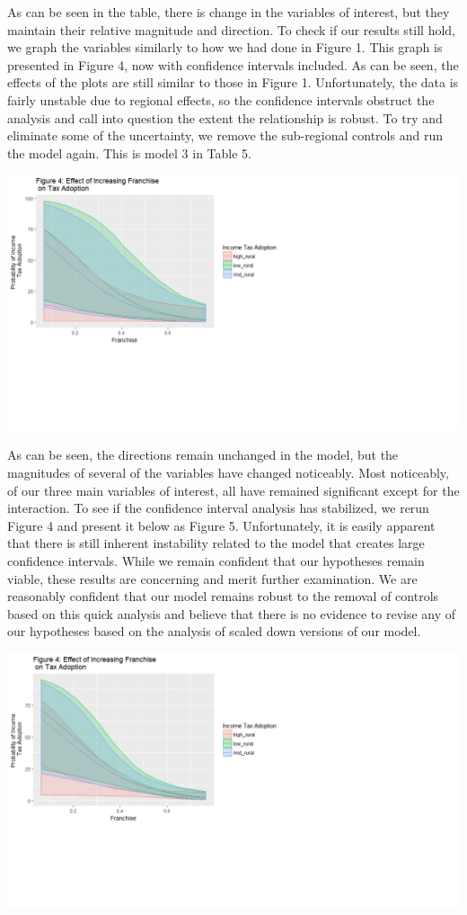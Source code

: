 \documentclass[letter, 12pt]{article}
\begin{document}
As can be seen in the table, there is change in the variables of interest, but they maintain their relative magnitude and direction. To check if our results still hold, we graph the variables similarly to how we had done in Figure 1. This graph is presented in Figure 4, now with confidence intervals included. As can be seen, the effects of the plots are still similar to those in Figure 1. Unfortunately, the data is fairly unstable due to regional effects, so the confidence intervals obstruct the analysis and call into question the extent the relationship is robust. To try and eliminate some of the uncertainty, we remove the sub-regional controls and run the model again. This is model 3 in Table 5.

\includegraphics[scale=1]{ps745-figure4}


 As can be seen, the directions remain unchanged in the model, but the magnitudes of several of the variables have changed noticeably. Most noticeably, of our three main variables of interest, all have remained significant except for the interaction. To see if the confidence interval analysis has stabilized, we rerun Figure 4 and present it below as Figure 5. Unfortunately, it is easily apparent that there is still inherent instability related to the model that creates large confidence intervals. While we remain confident that our hypotheses remain viable, these results are concerning and merit further examination. We are reasonably confident that our model remains robust to the removal of controls based on this quick analysis and believe that there is no evidence to revise any of our hypotheses based on the analysis of scaled down versions of our model.
 
 \includegraphics[scale=01]{ps745-figure5}
 
\end{document}
